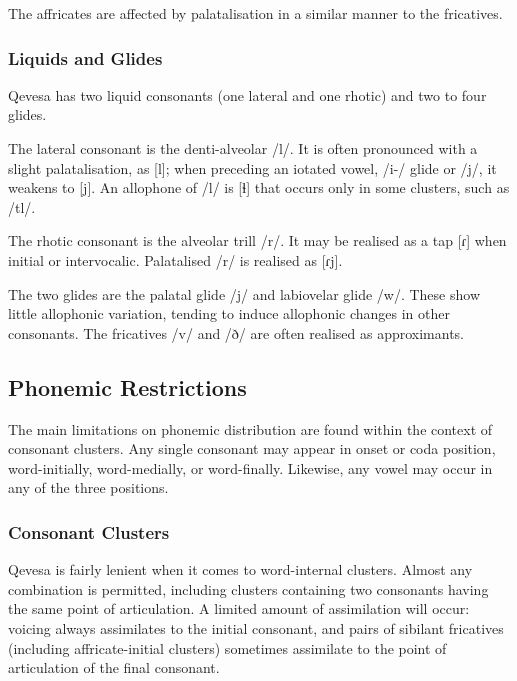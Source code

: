 \documentclass[grammar]{subfiles}
\begin{document}
  The affricates are affected by palatalisation in a similar manner to the fricatives.

  \subsubsection{Liquids and Glides}
  \label{sssec:liquids}

  Qevesa has two liquid consonants (one lateral and one rhotic) and two to four glides.

  The lateral consonant is the denti-alveolar /l/.  It is often pronounced with a slight palatalisation, as [l\superj]; when preceding an iotated vowel, /i-/ glide or /j/, it weakens to [j].  An allophone of /l/ is [ɬ] that occurs only in some clusters, such as /tl/.

  The rhotic consonant is the alveolar trill /r/.  It may be realised as a tap [ɾ] when initial or intervocalic.  Palatalised /r/ is realised as [ɾj].

  The two glides are the palatal glide /j/ and labiovelar glide /w/.  These show little allophonic variation, tending to induce allophonic changes in other consonants.  The fricatives /v/ and /ð/ are often realised as approximants.  

  \subsection{Phonemic Restrictions}
  \label{ssec:phonemic_restrictions}

  The main limitations on phonemic distribution are found within the context of consonant clusters.  Any single consonant may appear in onset or coda position, word-initially, word-medially, or word-finally.  Likewise, any vowel may occur in any of the three positions. 

  \subsubsection{Consonant Clusters}
  \label{sssec:consonant_clusters}

  Qevesa is fairly lenient when it comes to word-internal clusters. 
  Almost any combination is permitted, including clusters containing two consonants having the same point of articulation. 
  A limited amount of assimilation will occur: voicing always assimilates to the initial consonant, and pairs of sibilant fricatives (including affricate-initial clusters) sometimes assimilate to the point of articulation of the final consonant.  %
\end{document}
